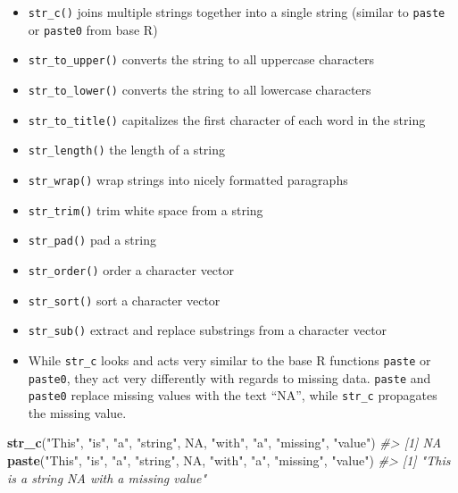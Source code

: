 \documentclass[]{book}
\newenvironment{Shaded}{\begin{snugshade}}{\end{snugshade}}
\newcommand{\KeywordTok}[1]{\textcolor[rgb]{0.13,0.29,0.53}{\textbf{#1}}}
\newcommand{\StringTok}[1]{\textcolor[rgb]{0.31,0.60,0.02}{#1}}
\newcommand{\CommentTok}[1]{\textcolor[rgb]{0.56,0.35,0.01}{\textit{#1}}}
\newcommand{\OtherTok}[1]{\textcolor[rgb]{0.56,0.35,0.01}{#1}}
\newcommand{\NormalTok}[1]{#1}
\providecommand{\tightlist}{%
  \setlength{\itemsep}{0pt}\setlength{\parskip}{0pt}}
\newenvironment{rmdblock}[1]
  {\begin{shaded*}
  \begin{itemize}
  \renewcommand{\labelitemi}{
    \raisebox{-.7\height}[0pt][0pt]{
      {\setkeys{Gin}{width=3em,keepaspectratio}\texttt{[image: images/\#1]}}
    }
  }
  \item
  }
  {
  \end{itemize}
  \end{shaded*}
  }
\newenvironment{rmdcaution}
  {\begin{rmdblock}{caution}}
  {\end{rmdblock}}
\theoremstyle{definition}
\theoremstyle{definition}
\theoremstyle{definition}
\theoremstyle{remark}
\begin{document}
\begin{itemize}
\tightlist
\item
  \texttt{str\_c()} joins multiple strings together into a single string
  (similar to \texttt{paste} or \texttt{paste0} from base R)
\item
  \texttt{str\_to\_upper()} converts the string to all uppercase
  characters
\item
  \texttt{str\_to\_lower()} converts the string to all lowercase
  characters
\item
  \texttt{str\_to\_title()} capitalizes the first character of each word
  in the string
\item
  \texttt{str\_length()} the length of a string
\item
  \texttt{str\_wrap()} wrap strings into nicely formatted paragraphs
\item
  \texttt{str\_trim()} trim white space from a string
\item
  \texttt{str\_pad()} pad a string
\item
  \texttt{str\_order()} order a character vector
\item
  \texttt{str\_sort()} sort a character vector
\item
  \texttt{str\_sub()} extract and replace substrings from a character
  vector
\end{itemize}

\begin{rmdcaution}
While \texttt{str\_c} looks and acts very similar to the base R
functions \texttt{paste} or \texttt{paste0}, they act very differently
with regards to missing data. \texttt{paste} and \texttt{paste0} replace
missing values with the text ``NA'', while \texttt{str\_c} propagates
the missing value.
\end{rmdcaution}

\begin{Shaded}
\begin{Highlighting}[]
\KeywordTok{str_c}\NormalTok{(}\StringTok{"This"}\NormalTok{, }\StringTok{"is"}\NormalTok{, }\StringTok{"a"}\NormalTok{, }\StringTok{"string"}\NormalTok{, }\OtherTok{NA}\NormalTok{, }\StringTok{"with"}\NormalTok{, }\StringTok{"a"}\NormalTok{, }\StringTok{"missing"}\NormalTok{, }\StringTok{"value"}\NormalTok{)}
\CommentTok{#> [1] NA}
\KeywordTok{paste}\NormalTok{(}\StringTok{"This"}\NormalTok{, }\StringTok{"is"}\NormalTok{, }\StringTok{"a"}\NormalTok{, }\StringTok{"string"}\NormalTok{, }\OtherTok{NA}\NormalTok{, }\StringTok{"with"}\NormalTok{, }\StringTok{"a"}\NormalTok{, }\StringTok{"missing"}\NormalTok{, }\StringTok{"value"}\NormalTok{)}
\CommentTok{#> [1] "This is a string NA with a missing value"}
\end{Highlighting}
\end{Shaded}
\end{document}
